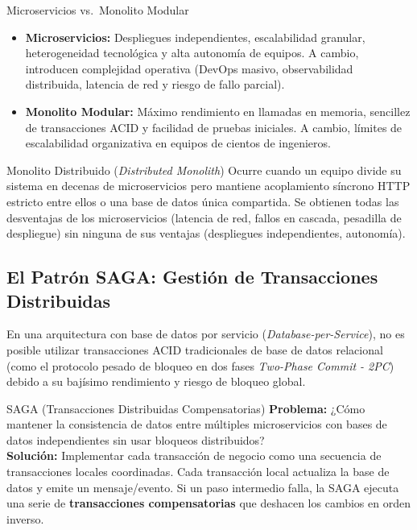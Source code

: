 \begin{tradeoff}{Microservicios vs.\ Monolito Modular}
\begin{itemize}[leftmargin=1.5em]
  \item \textbf{Microservicios:} Despliegues independientes, escalabilidad granular, heterogeneidad tecnológica y alta autonomía de equipos. A cambio, introducen complejidad operativa (DevOps masivo, observabilidad distribuida, latencia de red y riesgo de fallo parcial).
  \item \textbf{Monolito Modular:} Máximo rendimiento en llamadas en memoria, sencillez de transacciones ACID y facilidad de pruebas iniciales. A cambio, límites de escalabilidad organizativa en equipos de cientos de ingenieros.
\end{itemize}
\end{tradeoff}

\begin{antipatron}{Monolito Distribuido (\emph{Distributed Monolith})}
Ocurre cuando un equipo divide su sistema en decenas de microservicios pero mantiene acoplamiento síncrono HTTP estricto entre ellos o una base de datos única compartida. Se obtienen todas las desventajas de los microservicios (latencia de red, fallos en cascada, pesadilla de despliegue) sin ninguna de sus ventajas (despliegues independientes, autonomía).
\end{antipatron}

\subsection{El Patrón SAGA: Gestión de Transacciones Distribuidas}

En una arquitectura con base de datos por servicio (\emph{Database-per-Service}), no es posible utilizar transacciones ACID tradicionales de base de datos relacional (como el protocolo pesado de bloqueo en dos fases \emph{Two-Phase Commit - 2PC}) debido a su bajísimo rendimiento y riesgo de bloqueo global.

\begin{patronarquitectura}{SAGA (Transacciones Distribuidas Compensatorias)}
\textbf{Problema:} ¿Cómo mantener la consistencia de datos entre múltiples microservicios con bases de datos independientes sin usar bloqueos distribuidos?\\
\textbf{Solución:} Implementar cada transacción de negocio como una secuencia de transacciones locales coordinadas. Cada transacción local actualiza la base de datos y emite un mensaje/evento. Si un paso intermedio falla, la SAGA ejecuta una serie de \textbf{transacciones compensatorias} que deshacen los cambios en orden inverso.
\end{patronarquitectura}

